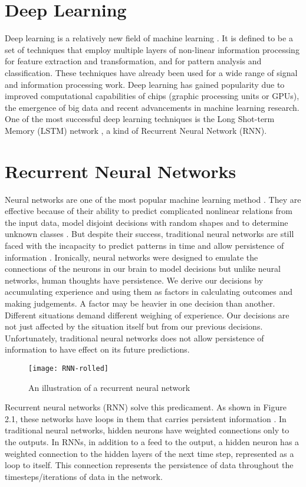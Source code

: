 \section{Deep Learning}
    Deep learning is a relatively new field of machine learning \citep{deng2014deep}. It is defined to be a set of techniques that employ multiple layers of non-linear information processing for feature extraction and transformation, and for pattern analysis and classification. These techniques have already been used for a wide range of signal and information processing work. Deep learning has gained popularity due to improved computational capabilities of chips (graphic processing units or GPUs), the emergence of big data and recent advancements in machine learning research. One of the most successful deep learning techniques is the Long Shot-term Memory (LSTM) network \citep{schmidhuber2015deep}, a kind of Recurrent Neural Network (RNN).

\section{Recurrent Neural Networks}
    Neural networks are one of the most popular machine learning method \citep{razi2005comparative}. They are effective because of their ability to predict complicated nonlinear relations from the input data, model disjoint decisions with random shapes and to determine unknown classes \citep{huang2006real}. But despite their success, traditional neural networks are still faced with the incapacity to predict patterns in time and allow persistence of information \citep{patan2008artificial}. Ironically, neural networks were designed to emulate the connections of the neurons in our brain to model decisions but unlike neural networks, human thoughts have persistence. We derive our decisions by accumulating experience and using them as factors in calculating outcomes and making judgements. A factor may be heavier in one decision than another. Different situations demand different weighing of experience. Our decisions are not just affected by the situation itself but from our previous decisions. Unfortunately, traditional neural networks does not allow persistence of information to have effect on its future predictions.

    \begin{figure}[h]
    \centering
    \texttt{[image: RNN-rolled]}
    \caption{An illustration of a recurrent neural network}
    \end{figure}
    Recurrent neural networks (RNN) solve this predicament. As shown in Figure 2.1, these networks have loops in them that carries persistent information \citep{mikolov2010recurrent}. In traditional neural networks, hidden neurons have weighted connections only to the outputs. In RNNs, in addition to a feed to the output, a hidden neuron has a weighted connection to the hidden layers of the next time step, represented as a loop to itself. This connection represents the persistence of data throughout the timesteps/iterations of data in the network.

